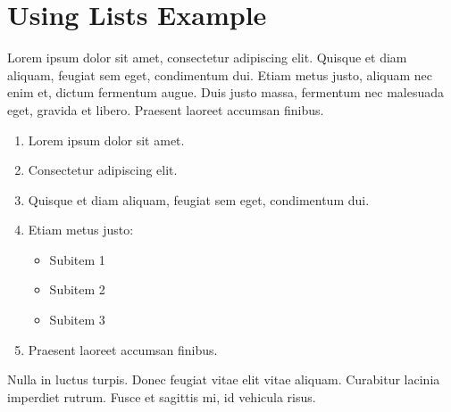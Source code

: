 %
%
%

\section{\label{sec:usinglists}Using Lists Example}

Lorem ipsum dolor sit amet, consectetur adipiscing elit. Quisque et diam aliquam, feugiat sem eget, condimentum dui.
Etiam metus justo, aliquam nec enim et, dictum fermentum augue. Duis justo massa, fermentum nec malesuada eget, gravida
et libero. Praesent laoreet accumsan finibus.

\begin{enumerate}
	\item Lorem ipsum dolor sit amet.
	\item Consectetur adipiscing elit.
	\item Quisque et diam aliquam, feugiat sem eget, condimentum dui.
	\item Etiam metus justo:
	      \begin{itemize}
		      \item Subitem 1
		      \item Subitem 2
		      \item Subitem 3
	      \end{itemize}
	\item Praesent laoreet accumsan finibus.
\end{enumerate}

Nulla in luctus turpis. Donec feugiat vitae elit vitae aliquam. Curabitur lacinia imperdiet rutrum. Fusce et sagittis
mi, id vehicula risus.

